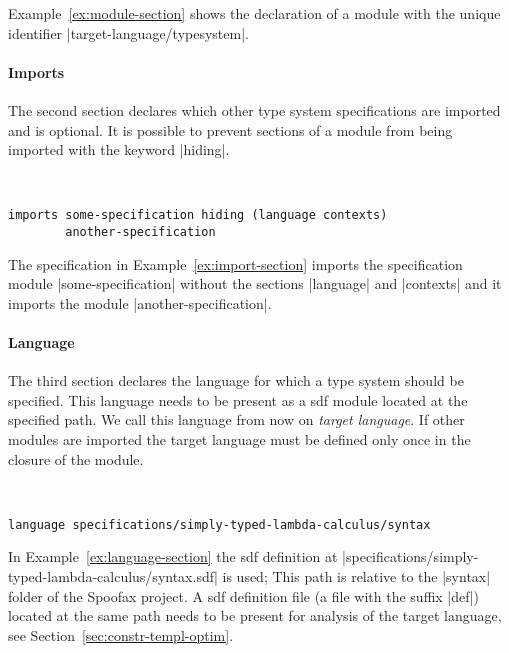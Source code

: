 Example~\ref{ex:module-section} shows the declaration of a module with
the unique identifier \code|target-language/typesystem|.

\paragraph{Imports} The second section declares which other type
system specifications are imported and is optional. It is possible to
prevent sections of a module from being imported with the keyword
\code|hiding|.

\begin{example}{~}
\begin{lstlisting}[language=sltc]    
imports some-specification hiding (language contexts)
        another-specification
\end{lstlisting}
\label{ex:import-section}
\end{example}

The specification in Example~\ref{ex:import-section} imports the
specification module \code|some-specification| without the sections
\code|language| and \code|contexts| and it imports the module
\code|another-specification|.

\paragraph{Language} The third section declares the language for which
a type system should be specified. This language needs to be present
as a \gls{sdf} module located at the specified path. We call this
language from now on \emph{target language}. If other modules are
imported the target language must be defined only once in the closure
of the module.

\begin{example}{~}
\begin{lstlisting}[language=sltc]
language specifications/simply-typed-lambda-calculus/syntax
\end{lstlisting}
\label{ex:language-section}
\end{example}

In Example~\ref{ex:language-section} the \gls{sdf} definition at
\code|specifications/simply-typed-lambda-calculus/syntax.sdf| is used;
This path is relative to the \code|syntax| folder of the Spoofax
project. A \gls{sdf} definition file (a file with the suffix
\code|def|) located at the same path needs to be present for analysis
of the target language, see Section~\ref{sec:constr-templ-optim}.

